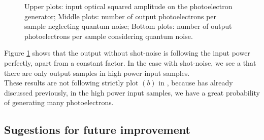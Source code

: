 \begin{refsection}
\begin{figure}[H]
	\caption{Upper plots: input optical squared amplitude on the photoelectron generator; Middle plots: number of output photoelectrons per sample neglecting quantum noise; Bottom plots: number of output photoelectrons per sample considering quantum noise.}
	\label{plot:quantum_noise_sim_variable}
\end{figure}
%
Figure \ref{plot:quantum_noise_sim_variable} shows that the output without shot-noise is following the input power perfectly, apart from a constant factor. In the case with shot-noise, we see a that there are only output samples in high power input samples.\\
These results are not following strictly plot $(b)$ in \cite{saleh1991}, because has already discussed previously, in the high power input samples, we have a great probability of generating many photoelectrons.
%
\subsection*{Sugestions for future improvement}


\clearpage
\printbibliography[heading=subbibliography]
\end{refsection}
\cleardoublepage



%
